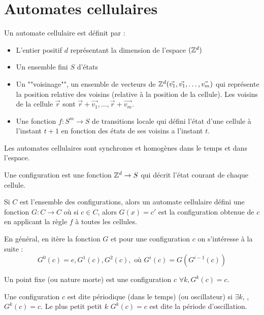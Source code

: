 \section{Automates cellulaires}

\begin{definition}
	Un automate cellulaire est définit par :
	\begin{itemize}
		\item L'entier positif $d$ représentant la dimension de l'espace $(\mathbb{Z}^d)$
		\item Un ensemble fini $S$ d'états
		\item Un ""voisinage"", \ie un ensemble de vecteurs de $\mathbb{Z}^d (\vec{v_1},  \vec{v_1}, \ldots ,\vec{v_m})$
		      qui représente la position relative des voisins (relative à la position de la cellule). Les voisins de la
		      cellule $\vec r$ sont $\vec r + \vec {v_1},  \ldots , \vec r + \vec {v_m}$.
		\item Une fonction $f : S ^ m \to S$ de transitions locale qui défini l'état d'une cellule à l'instant $t + 1$
		      en fonction des états de ses voisins a l'instant $t$.
	\end{itemize}
\end{definition}

Les automates cellulaires sont synchrones et homogènes dans le temps et dans l'espace.

\begin{definition}
	Une configuration est une fonction $\mathbb{Z} ^ d \to S$ qui décrit l'état courant de chaque cellule.

	Si $C$ est l'ensemble des configurations, alors un automate cellulaire défini une fonction $G: C \to C$ où si $c \in C$, alors
	$G(x) = c'$ est la configuration obtenue de $c$ en applicant la règle $f$ à toutes les cellules.

	En général, en itère la fonction $G$ et pour une configuration $c$ on s'intéresse à la suite :
	$$ G^0 (c) = e, G^1 (c), G^2 (c), \text{ où } G^i (c) = G ( G^{i - 1 }(c))$$
\end{definition}

\begin{definition}
	Un point fixe (ou nature morte) est une configuration $c$ \tlq $\forall k, G^k(c) = c$.
\end{definition}


\begin{definition}
	Une configuration $c$ est dite périodique (dans le temps) (ou oscillateur) si $\exists k$, \tq , $G^k(c) = c$. Le plus petit
	petit $k$ \tq $G^k(c) = c$ est dite la période d'oscillation.
\end{definition}

